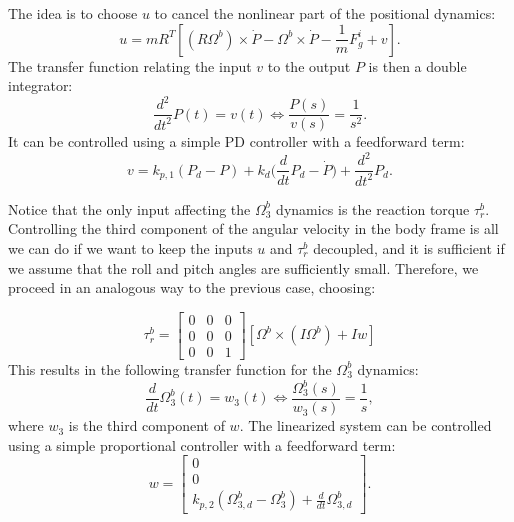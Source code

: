 The idea is to choose $u$ to cancel the nonlinear part of the positional dynamics:
$$u = m R^T [(R \Omega^b) \times \dot{P} - \Omega^b \times \dot{P} - \frac{1}{m} F_g^i + v].$$
The transfer function relating the input $v$ to the output $P$ is then a double integrator:
$$\frac{d^2}{dt^2} P(t) = v(t) \iff \frac{P(s)}{v(s)} = \frac{1}{s^2}.$$
It can be controlled using a simple PD controller with a feedforward term:
$$v = k_{p,1} (P_d - P) + k_d \bigg(\frac{d}{dt}P_d - \dot{P}\bigg) + \frac{d^2}{dt^2}P_d.$$

Notice that the only input affecting the $\Omega_3^b$ dynamics is the reaction torque $\tau_r^b$. Controlling the third component of the angular velocity in the body frame is all we can do if we want to keep the inputs $u$ and $\tau_r^b$ decoupled, and it is sufficient if we assume that the roll and pitch angles are sufficiently small. Therefore, we proceed in an analogous way to the previous case, choosing:

$$ \tau_r^b = \begin{bmatrix}
    0 & 0 & 0 \\ 0 & 0 & 0 \\ 0 & 0 & 1
\end{bmatrix}[\Omega^b \times (I \Omega^b) + I w]$$
This results in the following transfer function for the $\Omega_3^b$ dynamics:
$$\frac{d}{dt} \Omega_3^b(t) = w_3(t) \iff \frac{\Omega_3^b(s)}{w_3(s)} = \frac{1}{s},$$
where $w_3$ is the third component of $w$. The linearized system can be controlled using a simple proportional controller with a feedforward term:
$$w = \begin{bmatrix}
    0 \\ 0 \\k_{p,2} (\Omega_{3,d}^b - \Omega_3^b) + \frac{d}{dt}\Omega_{3,d}^b
\end{bmatrix} .$$

